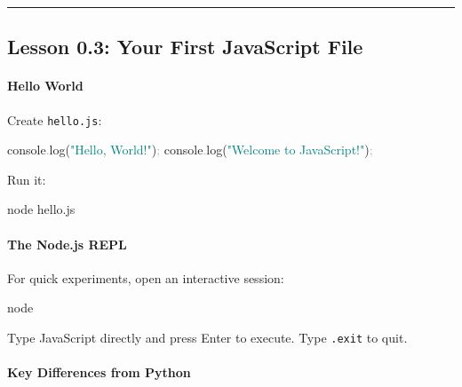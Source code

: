 \documentclass[
  justified,
  openright,
]{tufte-book}
\let\subsubsection\paragraph
\let\paragraph\paragraph
\newcommand{\BuiltInTok}[1]{#1}
\newcommand{\ExtensionTok}[1]{#1}
\newcommand{\FunctionTok}[1]{\textcolor{BrandBlue}{#1}}
\newcommand{\NormalTok}[1]{#1}
\newcommand{\OperatorTok}[1]{\textcolor{DarkGray}{#1}}
\newcommand{\StringTok}[1]{\textcolor{Teal}{#1}}
\newenvironment{Shaded}{%
  \begin{snugshade}
}{%
  \end{snugshade}
}
\let\subsubsection\paragraph
\let\paragraph\paragraph
\begin{document}
\begin{center}\rule{0.5\linewidth}{0.5pt}\end{center}

\subsection{Lesson 0.3: Your First JavaScript
File}\label{lesson-0.3-your-first-javascript-file}

\subsubsection{Hello World}\label{hello-world}

Create \texttt{hello.js}:

\begin{Shaded}
\begin{Highlighting}[]
\BuiltInTok{console}\OperatorTok{.}\FunctionTok{log}\NormalTok{(}\StringTok{"Hello, World!"}\NormalTok{)}\OperatorTok{;}
\BuiltInTok{console}\OperatorTok{.}\FunctionTok{log}\NormalTok{(}\StringTok{"Welcome to JavaScript!"}\NormalTok{)}\OperatorTok{;}
\end{Highlighting}
\end{Shaded}

Run it:

\begin{Shaded}
\begin{Highlighting}[]
\ExtensionTok{node}\NormalTok{ hello.js}
\end{Highlighting}
\end{Shaded}

\subsubsection{The Node.js REPL}\label{the-node.js-repl}

For quick experiments, open an interactive session:

\begin{Shaded}
\begin{Highlighting}[]
\ExtensionTok{node}
\end{Highlighting}
\end{Shaded}

Type JavaScript directly and press Enter to execute. Type \texttt{.exit}
to quit.

\subsubsection{Key Differences from
Python}\label{key-differences-from-python}
\end{document}
